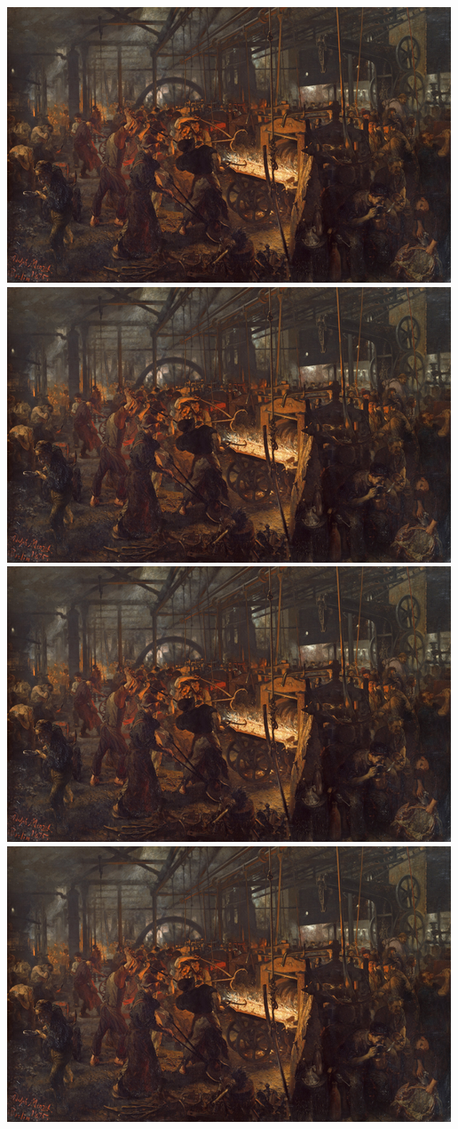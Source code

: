 \documentclass[
  letterpaper,
  DIV=11,
  numbers=noendperiod]{scrartcl}
\begin{document}
\includegraphics{paintingsSommer_files/figure-pdf/cell-5-output-5.png}
\includegraphics{paintingsSommer_files/figure-pdf/cell-5-output-6.png}
\includegraphics{paintingsSommer_files/figure-pdf/cell-5-output-7.png}
\includegraphics{paintingsSommer_files/figure-pdf/cell-5-output-8.png}
\end{document}
